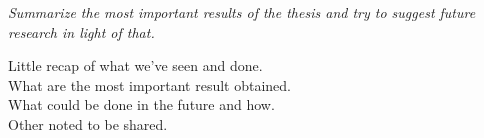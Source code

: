 \textit{Summarize the most important results of the thesis and try to suggest future research in light of that.}

Little recap of what we've seen and done.\\
What are the most important result obtained.\\
What could be done in the future and how.\\
Other noted to be shared.
